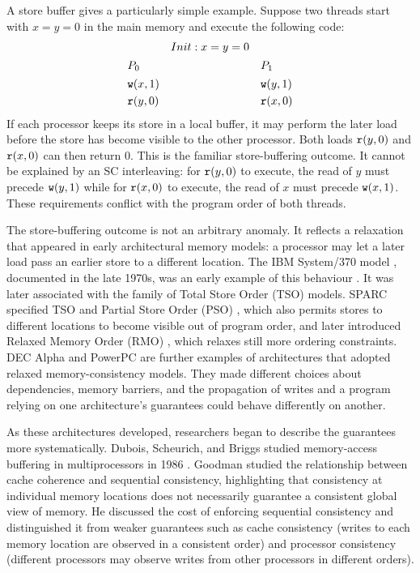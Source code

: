 A store buffer gives a particularly simple example. Suppose two threads start with $x=y=0$ in the main memory and execute the following code:
\[
\begin{array}{llll}
 & Init: x=y=0 & \\[1.5mm]

P_0 & & P_1\\[1.5mm]

\mathtt{w}(x,1) & & \mathtt{w}(y,1)\\[1mm]

\mathtt{r}(y,0) & & \mathtt{r}(x,0)\\
\end{array}
\]
If each processor keeps its store in a local buffer, it may perform the later load before the store has become visible to the other processor. Both loads $\mathtt{r}(y,0)$ and $\mathtt{r}(x,0)$ can then return $0$. This is the familiar store-buffering outcome. It cannot be explained by an SC interleaving: for $\mathtt{r}(y,0)$ to execute, the read of $y$ must precede $\mathtt{w}(y,1)$ while for $\mathtt{r}(x,0)$ to execute, the read of $x$ must precede $\mathtt{w}(x,1)$. These requirements conflict with the program order of both threads.

The store-buffering outcome is not an arbitrary anomaly. It reflects a relaxation that appeared in early architectural memory models: a processor may let a later load pass an earlier store to a different location. The IBM System/370 model \cite{ibm370principles1975}  \cite{ibm3701983}, documented in the late 1970s, was an early example of this behaviour \cite{DBLP:journals/computer/AdveG96}. It was later associated with the family of Total Store Order (TSO) models. SPARC specified TSO and Partial Store Order (PSO) \cite{sun1991sparc}, which also permits stores to different locations to become visible out of program order, and later introduced Relaxed Memory Order (RMO) \cite{sparc1994architecture}, which relaxes still more ordering constraints. DEC Alpha \cite{alpha1992} and PowerPC \cite{powerpc1993} are further examples of architectures that adopted relaxed memory-consistency models. They made different choices about dependencies, memory barriers, and the propagation of writes and a program relying on one architecture's guarantees could behave differently on another. 

As these architectures developed, researchers began to describe the guarantees more systematically. Dubois, Scheurich, and Briggs studied memory-access buffering in multiprocessors in 1986 \cite{dubois1986memory}. Goodman \cite{goodman1989cache} studied the relationship between cache coherence and sequential consistency, highlighting that consistency at individual memory locations does not necessarily guarantee a consistent global view of memory. He discussed the cost of enforcing sequential consistency and distinguished it from weaker guarantees such as cache consistency (writes to each memory location are observed in a consistent order) and processor consistency (different processors may observe writes from other processors in different orders). %

